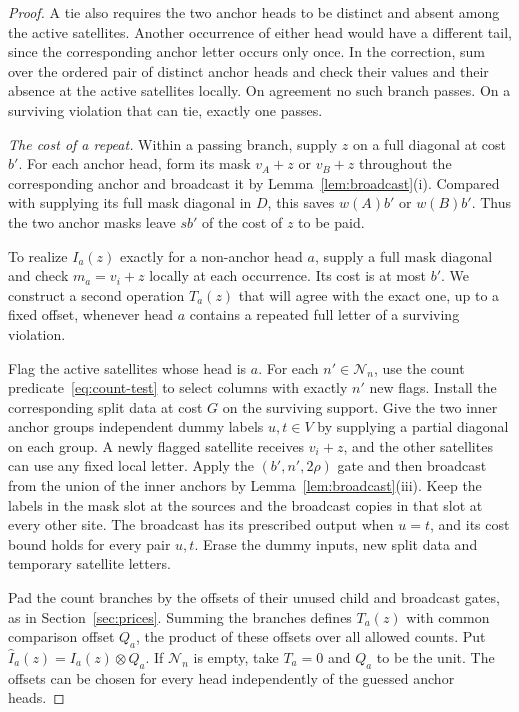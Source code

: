 \begin{proof}
A tie also requires the two anchor heads to be distinct and absent
among the active satellites. Another occurrence of either head would
have a different tail, since the corresponding anchor letter occurs
only once. In the correction, sum over the ordered pair of distinct
anchor heads and check their values and their absence at the active
satellites locally. On agreement no such branch passes. On a surviving
violation that can tie, exactly one passes.

\smallskip\noindent\emph{The cost of a repeat.}
Within a passing branch, supply \(z\) on a full diagonal at cost \(b'\).
For each anchor head, form its mask \(v_A+z\) or \(v_B+z\) throughout
the corresponding anchor and broadcast it by Lemma~\ref{lem:broadcast}(i).
Compared with supplying its full mask diagonal in \(D\), this saves
\(w(A)b'\) or \(w(B)b'\). Thus the two anchor masks leave \(s b'\) of
the cost of \(z\) to be paid.

To realize \(I_a(z)\) exactly for a non-anchor head \(a\), supply a
full mask diagonal and check \(m_a=v_i+z\) locally at each occurrence. Its cost is at most \(b'\).
We construct a second operation \(T_a(z)\) that will agree with the
exact one, up to a fixed offset, whenever head \(a\) contains a
repeated full letter of a surviving violation.

Flag the active satellites whose head is \(a\). For each
\(n'\in\mathcal N_n\), use the count predicate~\eqref{eq:count-test} to
select columns with exactly \(n'\) new flags. Install the corresponding
split data at cost \(G\) on the surviving support. Give the two inner
anchor groups independent dummy labels \(u,t\in V\) by supplying a
partial diagonal on each group. A newly flagged satellite receives
\(v_i+z\), and the other satellites can use any fixed local letter.
Apply the \((b',n',2\rho)\) gate and then broadcast from the union of
the inner anchors by Lemma~\ref{lem:broadcast}(iii). Keep the labels
in the mask slot at the sources and the broadcast copies in that slot
at every other site. The broadcast has its prescribed output when
\(u=t\), and its cost bound holds for every pair \(u,t\). Erase the
dummy inputs, new split data and temporary satellite letters.

Pad the count branches by the offsets of their unused child and
broadcast gates, as in Section~\ref{sec:prices}. Summing the branches
defines \(T_a(z)\) with common comparison offset \(Q_a\), the product
of these offsets over all allowed counts. Put
\(\widehat I_a(z)=I_a(z)\otimes Q_a\). If \(\mathcal N_n\) is empty,
take \(T_a=0\) and \(Q_a\) to be the unit. The offsets can be chosen
for every head independently of the guessed anchor heads.


\end{proof}
